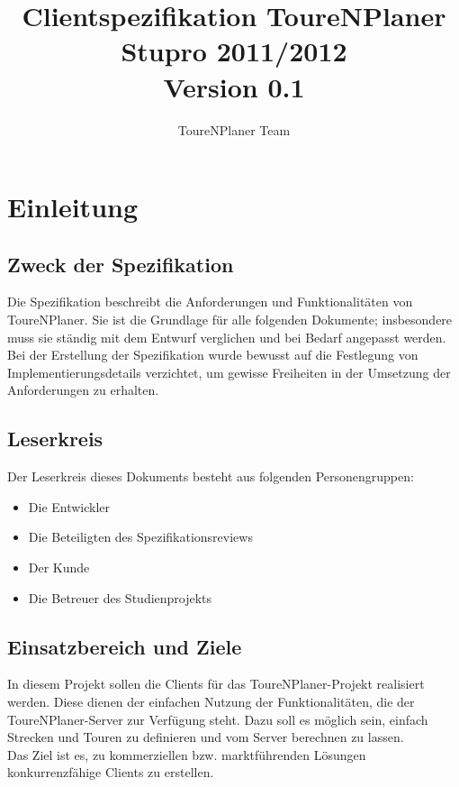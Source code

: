 \documentclass[a4paper,10pt,titlepage]{article}
\author{ToureNPlaner Team}
\title{Clientspezifikation ToureNPlaner\\ Stupro 2011/2012\\ Version 0.1}
\begin{document}
\maketitle
{}
\setcounter{page}{1}
\tableofcontents
\clearpage
{}
\setcounter{page}{1}

\section{Einleitung}
\subsection{Zweck der Spezifikation}
Die Spezifikation beschreibt die Anforderungen und Funktionalitäten von ToureNPlaner. Sie ist die Grundlage für alle folgenden Dokumente; insbesondere muss sie ständig mit dem Entwurf verglichen und bei Bedarf angepasst werden.\\
Bei der Erstellung der Spezifikation wurde bewusst auf die Festlegung von Implementierungsdetails verzichtet, um gewisse Freiheiten in der Umsetzung der Anforderungen zu erhalten.

\subsection{Leserkreis}
Der Leserkreis dieses Dokuments besteht aus folgenden Personengruppen:
\begin{itemize}
\item Die Entwickler
\item Die Beteiligten des Spezifikationsreviews
\item Der Kunde
\item Die Betreuer des Studienprojekts
\end{itemize}

\subsection{Einsatzbereich und Ziele}

In diesem Projekt sollen die Clients für das ToureNPlaner-Projekt realisiert werden.
Diese dienen der einfachen Nutzung der Funktionalitäten, die der ToureNPlaner-Server zur Verfügung steht.
Dazu soll es möglich sein, einfach Strecken und Touren zu definieren und vom Server berechnen zu lassen.\\
Das Ziel ist es, zu kommerziellen bzw. marktführenden Lösungen konkurrenzfähige Clients zu erstellen.
\end{document}
